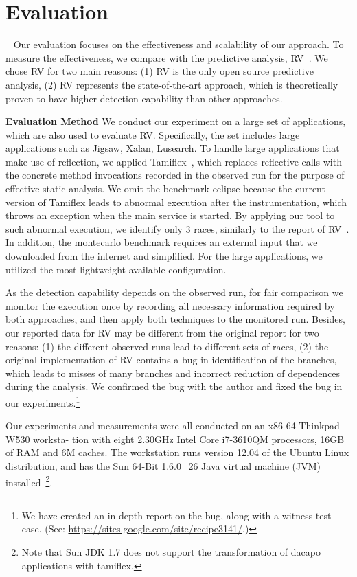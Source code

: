 \section{Evaluation}~\label{sec:eval}
Our evaluation focuses on the effectiveness  and scalability of our approach.
To measure the effectiveness, we compare with the predictive analysis, {\sf RV}~\cite{}. We chose RV for two main reasons: (1) {\sf RV} is the only open source predictive analysis, (2) {\sf RV} represents the state-of-the-art approach, which is theoretically proven to have higher detection capability than other approaches. 

{\bf Evaluation Method} We conduct our experiment on a large set of applications, which are also used to evaluate {\sf RV}. Specifically, the set includes large applications such as {\sf Jigsaw}, {\sf Xalan}, {\sf Lusearch}. To handle large applications that make use of reflection, we applied {\sf Tamiflex}~\cite{}, which replaces reflective calls with the concrete method invocations recorded in the observed run for the purpose of effective static analysis.  We omit the benchmark {\sf eclipse} because the current version of {\sf Tamiflex}  leads to abnormal execution after the instrumentation, which throws an exception when the main service is started. By applying our tool to such abnormal execution, we identify only 3 races, similarly to the report of RV~\cite{}.
In addition, the {\sf montecarlo} benchmark requires an external input that we downloaded from the internet and simplified. For the large applications, we utilized the most lightweight available configuration.


 As the detection capability  depends on the observed run, for fair comparison we monitor the execution once by recording all necessary information required by both approaches, and then apply both techniques to the monitored run. Besides, our reported data for RV may be different from the original report for two reasons: (1) the different observed runs lead to different sets of races, (2) the original implementation of RV contains a bug in identification of the branches, which leads to  misses of many branches and  incorrect reduction of dependences during the analysis. We confirmed the bug with the author and fixed the bug in our experiments.\footnote{We have created an in-depth report on the bug, along with a witness test case. (See:  \url{https://sites.google.com/site/recipe3141/}.)}


Our experiments and measurements 
were all conducted on an x86 64 Thinkpad W530 worksta- 
tion with eight 2.30GHz Intel Core i7-3610QM processors, 
16GB of RAM and 6M caches. The workstation runs version 12.04 of the Ubuntu Linux distribution, and has the Sun 
64-Bit 1.6.0\_26 Java virtual machine (JVM) installed~\footnote{Note that Sun JDK 1.7 does not support the transformation of dacapo applications with {\sf tamiflex}.}. 


